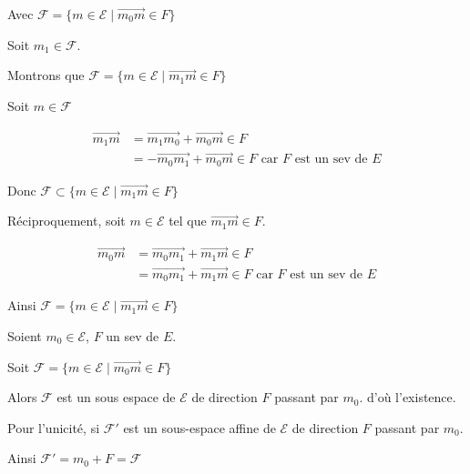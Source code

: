 \documentclass[a4paper, 12pt]{article}
\begin{document}
\begin{demonstration}
    Avec $\mathscr{F} = \{m \in \mathscr{E} \mid \vec{m_0 m} \in F\}$

    Soit $m_1 \in \mathscr{F}$.

    Montrons que $\mathscr{F} = \{m \in \mathscr{E} \mid \vec{m_1 m} \in F\}$

    Soit $m \in \mathscr{F}$

    \begin{align*}
        \vec{m_1 m} &= \vec{m_1 m_0} + \vec{m_0 m} \in F\\
        &= -\vec{m_0 m_1} + \vec{m_0 m} \in F \text{ car $F$ est un sev de $E$}
    \end{align*}

    Donc $\mathscr{F} \subset \{m \in \mathscr{E} \mid \vec{m_1 m} \in F\}$

    Réciproquement, soit $m \in \mathscr{E}$ tel que $\vec{m_1 m} \in F$.

    \begin{align*}
        \vec{m_0 m} &= \vec{m_0 m_1} + \vec{m_1 m} \in F\\
        &= \vec{m_0 m_1} + \vec{m_1 m} \in F \text{ car $F$ est un sev de $E$}
    \end{align*}

    Ainsi $\mathscr{F} = \{m \in \mathscr{E} \mid \vec{m_1 m} \in F\}$
\end{demonstration}

\begin{demonstration}
    Soient $m_0 \in \mathscr{E}$, $F$ un sev de $E$.

    Soit $\mathscr{F} = \{m \in \mathscr{E} \mid \vec{m_0 m} \in F\}$

    Alors $\mathscr{F}$ est un sous espace de $\mathscr{E}$ de direction $F$ passant par $m_0$.
    d'où l'existence.

    Pour l'unicité, si $\mathscr{F'}$ est un sous-espace affine de $\mathscr{E}$ de direction $F$ passant par $m_0$.

    Ainsi $\mathscr{F'} = m_0 + F = \mathscr{F}$
\end{demonstration}
\end{document}
